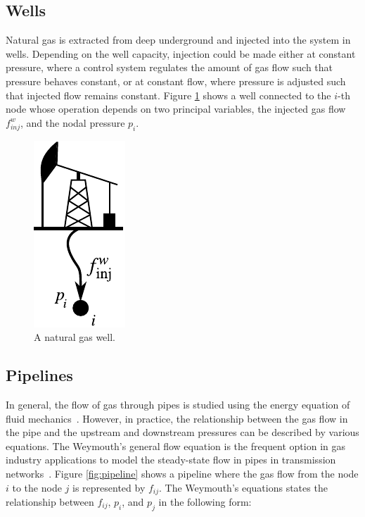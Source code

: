 \subsection{Wells}
\label{subsec:wells}

Natural gas is extracted from deep underground and injected into the system in wells. Depending on the well capacity, injection could be made either at constant pressure, where a control system regulates the amount of gas flow such that pressure behaves constant, or at constant flow, where pressure is adjusted such that injected flow remains constant. Figure \ref{fig:well} shows a well connected to the $i$-th node whose operation depends on two principal variables, the injected gas flow $f_{inj}^w$, and the nodal pressure $p_i$.

\begin{figure}[!ht]
	\centering
	\includegraphics[scale=0.9]{Figures/Well}
	\caption{A natural gas well.}	
	\label{fig:well}
\end{figure}

\subsection{Pipelines}
\label{subsec:pipelines}

In general, the flow of gas through pipes is studied using the energy equation of fluid mechanics~\cite{Banda2006}. However, in practice, the relationship between the gas flow in the pipe and the upstream and downstream pressures can be described by various equations. The Weymouth's general flow equation is the frequent option in gas industry applications to model the steady-state flow in pipes in transmission networks~\cite{Woldeyohannes2011}. Figure \ref{fig:pipeline} shows a pipeline where the gas flow from the node $i$ to the node $j$ is represented by $f_{ij}$. The Weymouth's equations states the relationship between $f_{ij}$, $p_i$, and $p_j$ in the following form:


